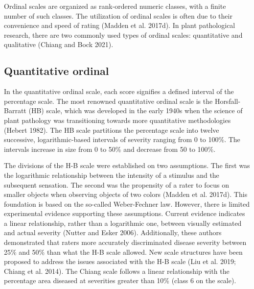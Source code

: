 \documentclass[
  letterpaper,
  DIV=11,
  numbers=noendperiod]{scrreprt}
\begin{document}
Ordinal scales are organized as rank-ordered numeric classes, with a
finite number of such classes. The utilization of ordinal scales is
often due to their convenience and speed of rating (Madden et al.
2017d). In plant pathological research, there are two commonly used
types of ordinal scales: quantitative and qualitative (Chiang and Bock
2021).

\hypertarget{quantitative-ordinal}{%
\subsection{Quantitative ordinal}\label{quantitative-ordinal}}

In the quantitative ordinal scale, each score signifies a defined
interval of the percentage scale. The most renowned quantitative ordinal
scale is the Horsfall-Barratt (HB) scale, which was developed in the
early 1940s when the science of plant pathology was transitioning
towards more quantitative methodologies (Hebert 1982). The HB scale
partitions the percentage scale into twelve successive,
logarithmic-based intervals of severity ranging from 0 to 100\%. The
intervals increase in size from 0 to 50\% and decrease from 50 to 100\%.

\begin{tcolorbox}[enhanced jigsaw, bottomtitle=1mm, colbacktitle=quarto-callout-warning-color!10!white, breakable, left=2mm, leftrule=.75mm, rightrule=.15mm, toprule=.15mm, colframe=quarto-callout-warning-color-frame, arc=.35mm, toptitle=1mm, opacityback=0, coltitle=black, title=\textcolor{quarto-callout-warning-color}{\faExclamationTriangle}\hspace{0.5em}{Controversy of the H-B scale}, colback=white, titlerule=0mm, bottomrule=.15mm, opacitybacktitle=0.6]

The divisions of the H-B scale were established on two assumptions. The
first was the logarithmic relationship between the intensity of a
stimulus and the subsequent sensation. The second was the propensity of
a rater to focus on smaller objects when observing objects of two colors
(Madden et al. 2017d). This foundation is based on the so-called
Weber-Fechner law. However, there is limited experimental evidence
supporting these assumptions. Current evidence indicates a linear
relationship, rather than a logarithmic one, between visually estimated
and actual severity (Nutter and Esker 2006). Additionally, these authors
demonstrated that raters more accurately discriminated disease severity
between 25\% and 50\% than what the H-B scale allowed. New scale
structures have been proposed to address the issues associated with the
H-B scale (Liu et al. 2019; Chiang et al. 2014). The Chiang scale
follows a linear relationship with the percentage area diseased at
severities greater than 10\% (class 6 on the scale).

\end{tcolorbox}
\end{document}

